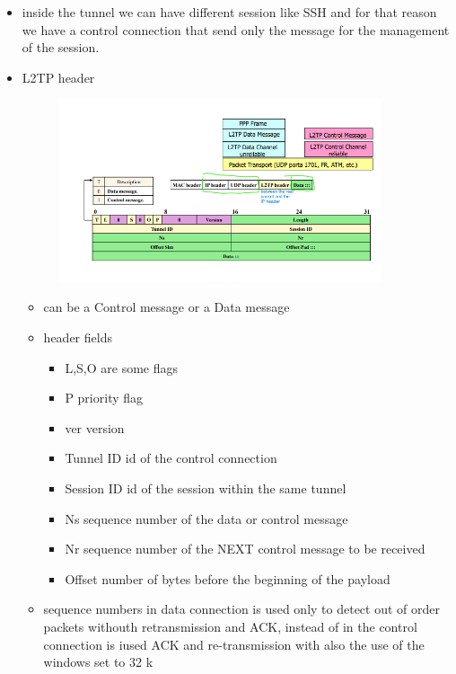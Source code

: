 \documentclass{article}
\begin{document}
\begin{itemize}
\begin{figure}[H]
    \end{figure}
    \item inside the tunnel we can have different session like SSH and for that reason we have a control connection that send only the message for the management of the session.
    \item L2TP header
    \begin{figure}[H]
        \centering
        \includegraphics[width=0.90\textwidth]{figure/L2TP_header.png}
    \end{figure}
    \begin{itemize}
        \item can be a Control message or a Data message
        \item header fields
        \begin{itemize}
            \item L,S,O are some flags
            \item P priority flag
            \item ver version
            \item Tunnel ID id of the control connection
            \item Session ID id of the session within the same tunnel
            \item Ns sequence number of the data or control message
            \item Nr sequence number of the NEXT control message to be received
            \item Offset number of bytes before the beginning of the payload
        \end{itemize}
        \item sequence numbers in data connection is used only to detect out of order packets withouth retransmission and ACK, instead of in the control connection is iused ACK and re-transmission with also the use of the windows set to 32 k

\end{itemize}
\end{itemize}
\end{document}
